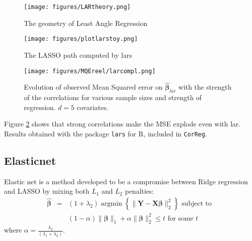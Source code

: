 \documentclass[12pt,a4paper]{report}
\begin{document}
\begin{figure}[h!]
	\centering
		  \texttt{[image: figures/LARtheory.png]}
		\caption{The geometry of Least Angle Regression}
	\end{figure}
				
\begin{figure}[h!]
	\centering
		  \texttt{[image: figures/plotlarstoy.png]}
		\caption{The LASSO path computed by lars}\label{plotlarstoy}
	\end{figure}			
	
		 \begin{figure}
	 \centering
	  \texttt{[image: figures/MQEreel/larcompl.png]}
	  \caption{Evolution of observed Mean Squared error on $\hat{\boldsymbol{\beta}}_{lar}$ with the strength of the correlations for various sample sizes and strength of regression. $d=5$ covariates. } \label{MQElarcompl}
	\end{figure}	
	 Figure \ref{MQElarcompl} shows that strong correlations make the MSE explode even with lar. Results obtained with the package {\tt lars} for R, included in {\tt CorReg}.
 	 
	 \FloatBarrier
		\subsection{Elasticnet}		%

			Elastic net \cite{zou2005regularization} is a method developed to be a compromise between Ridge regression and \textsc{LASSO} by mixing both $L_1$ and $L_2$ penalties: 
	\begin{eqnarray}
		\boldsymbol{\hat{\beta}}&=&(1+\lambda_2) \operatorname{argmin}\left\lbrace \parallel \boldsymbol{Y}-\boldsymbol{X\beta} \parallel_2^2 \right\rbrace \textrm{ subject to} \nonumber \\
			 & &(1-\alpha)\parallel\boldsymbol{\beta}\parallel_1+\alpha\parallel\boldsymbol{\beta}\parallel_2^2\leq t \textrm{ for some } t
	\end{eqnarray}
	where $\alpha=\frac{\lambda_2}{(\lambda_1+\lambda_2)}$. 
	
\end{document}
